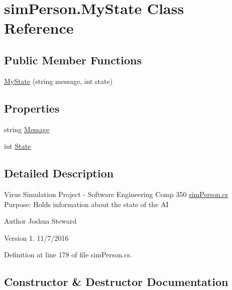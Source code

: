 \hypertarget{classsim_person_1_1_my_state}{}\section{sim\+Person.\+My\+State Class Reference}
\label{classsim_person_1_1_my_state}
\subsection*{Public Member Functions}
\begin{DoxyCompactItemize}
\item 
\hyperlink{classsim_person_1_1_my_state_a574e4fde1a676805dcc1aa580f4b7ed7}{My\+State} (string message, int state)
\end{DoxyCompactItemize}
\subsection*{Properties}
\begin{DoxyCompactItemize}
\item 
string \hyperlink{classsim_person_1_1_my_state_ad0e3e9f33288888b8c76d70b1a78a460}{Message}
\item 
int \hyperlink{classsim_person_1_1_my_state_a8ea6e800212a919c234ce917b0b75904}{State}
\end{DoxyCompactItemize}


\subsection{Detailed Description}
Virus Simulation Project -\/ Software Engineering Comp 350 \hyperlink{sim_person_8cs}{sim\+Person.\+cs} Purpose\+: Holds information about the state of the AI

\begin{DoxyAuthor}{Author}
Joshua Steward 
\end{DoxyAuthor}
\begin{DoxyVersion}{Version}
1. 11/7/2016 
\end{DoxyVersion}


Definition at line 178 of file sim\+Person.\+cs.



\subsection{Constructor \& Destructor Documentation}
\hypertarget{classsim_person_1_1_my_state_a574e4fde1a676805dcc1aa580f4b7ed7}{}\label{classsim_person_1_1_my_state_a574e4fde1a676805dcc1aa580f4b7ed7} 
